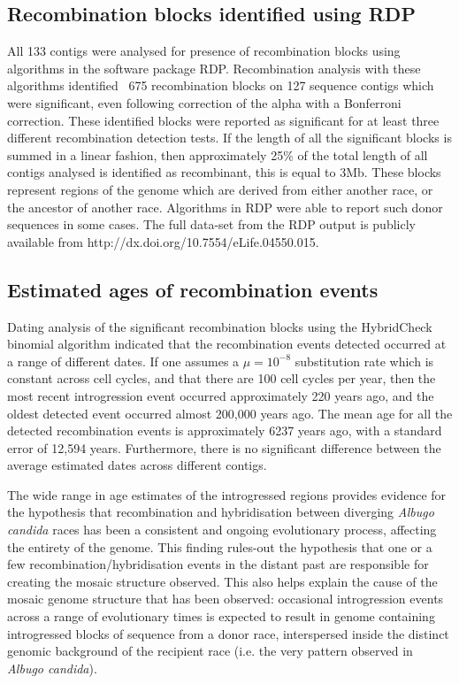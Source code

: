 \subsection{Recombination blocks identified using RDP}
All 133 contigs were analysed for presence of recombination blocks using algorithms in the software package RDP.
Recombination analysis with these algorithms identified ~675 recombination blocks on 127 sequence contigs which were significant, even following correction of the alpha with a Bonferroni correction.
These identified blocks were reported as significant for at least three different recombination detection tests.
If the length of all the significant blocks is summed in a linear fashion, then approximately 25\% of the total length of all contigs analysed is identified as recombinant, this is equal to 3Mb.
These blocks represent regions of the genome which are derived from either another race, or the ancestor of another race.
Algorithms in RDP were able to report such donor sequences in some cases. 
The full data-set from the RDP output is publicly available from http://dx.doi.org/10.7554/eLife.04550.015.

\subsection{Estimated ages of recombination events}
Dating analysis of the significant recombination blocks using the HybridCheck binomial algorithm indicated that the recombination events detected occurred at a range of different dates. If one assumes a $\mu = 10^{-8}$ substitution rate which is constant across cell cycles, and that there are 100 cell cycles per year, then the most recent introgression event occurred approximately 220 years ago, and the oldest detected event occurred almost 200,000 years ago. The mean age for all the detected recombination events is approximately 6237 years ago, with a standard error of 12,594 years. Furthermore, there is no significant difference between the average estimated dates across different contigs.

The wide range in age estimates of the introgressed regions provides evidence for the hypothesis that recombination and hybridisation between diverging \textit{Albugo candida} races has been a consistent and ongoing evolutionary process, affecting the entirety of the genome. This finding rules-out the hypothesis that one or a few recombination/hybridisation events in the distant past are responsible for creating the mosaic structure observed. This also helps explain the cause of the mosaic genome structure that has been observed: occasional introgression events across a range of evolutionary times is expected to result in genome containing introgressed blocks of sequence from a donor race, interspersed inside the distinct genomic background of the recipient race (i.e. the very pattern observed in \textit{Albugo candida}).

